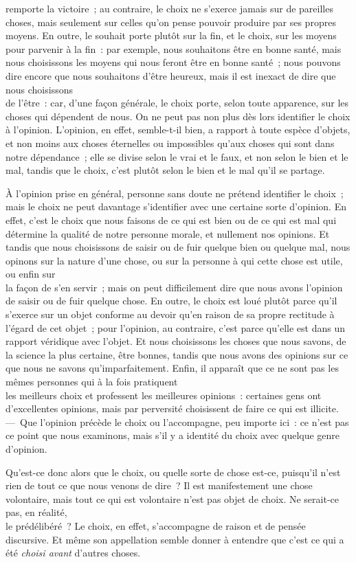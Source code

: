 \documentclass[french,twoside]{book} %
\begin{document}
remporte la victoire ; au contraire, le choix ne s’exerce jamais sur de pareilles choses, mais seulement sur celles qu’on pense pouvoir produire par ses propres moyens. En outre, le souhait porte plutôt sur la fin, et le choix, sur les moyens pour parvenir à la fin : par exemple, nous souhaitons être en bonne santé, mais nous choisissons les moyens qui nous feront être en bonne santé ; nous pouvons dire encore que nous souhaitons d’être heureux, mais il est inexact de dire que nous choisissons \\
de l’être : car, d’une façon générale, le choix porte, selon toute apparence, sur les choses qui dépendent de nous. On ne peut pas non plus dès lors identifier le choix à l’opinion. L’opinion, en effet, semble-t-il bien, a rapport à toute espèce d’objets, et non moins aux choses éternelles ou impossibles qu’aux choses qui sont dans notre dépendance ; elle se divise selon le vrai et le faux, et non selon le bien et le mal, tandis que le choix, c’est plutôt selon le bien et le mal qu’il se partage.\par
 À l’opinion prise en général, personne sans doute ne prétend identifier le choix ; mais le choix ne peut davantage s’identifier avec une certaine sorte d’opinion. En effet, c’est le choix que nous faisons de ce qui est bien ou de ce qui est mal qui détermine la qualité de notre personne morale, et nullement nos opinions. Et tandis que nous choisissons de saisir ou de fuir quelque bien ou quelque mal, nous opinons sur la nature d’une chose, ou sur la personne à qui cette chose est utile, ou enfin sur \\
la façon de s’en servir ; mais on peut difficilement dire que nous avons l’opinion de saisir ou de fuir quelque chose. En outre, le choix est loué plutôt parce qu’il s’exerce sur un objet conforme au devoir qu’en raison de sa propre rectitude à l’égard de cet objet ; pour l’opinion, au contraire, c’est parce qu’elle est dans un rapport véridique avec l’objet. Et nous choisissons les choses que nous savons, de la science la plus certaine, être bonnes, tandis que nous avons des opinions sur ce que nous ne savons qu’imparfaitement. Enfin, il apparaît que ce ne sont pas les mêmes personnes qui à la fois pratiquent \\
les meilleurs choix et professent les meilleures opinions : certaines gens ont d’excellentes opinions, mais par perversité choisissent de faire ce qui est illicite. — Que l’opinion précède le choix ou l’accompagne, peu importe ici : ce n’est pas ce point que nous examinons, mais s’il y a identité du choix avec quelque genre d’opinion.\par
Qu’est-ce donc alors que le choix, ou quelle sorte de chose est-ce, puisqu’il n’est rien de tout ce que nous venons de dire ? Il est manifestement une chose volontaire, mais tout ce qui est volontaire n’est pas objet de choix. Ne serait-ce pas, en réalité, \\
le prédélibéré ? Le choix, en effet, s’accompagne de raison et de pensée discursive. Et même son appellation semble donner à entendre que c’est ce qui a été {\itshape choisi avant} d’autres choses.
\end{document}
